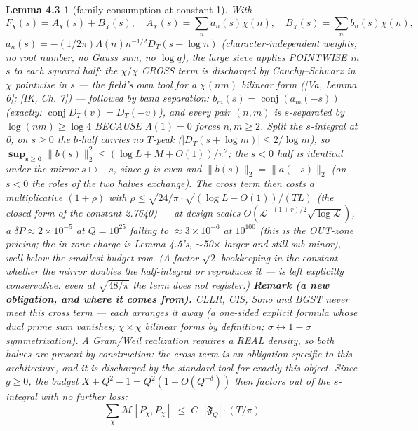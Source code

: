 \documentclass[11pt]{amsart}
\newcommand{\conj}{\operatorname{conj}}
\theoremstyle{plain}
\newtheorem*{lemmafourthree}{Lemma 4.3}
\theoremstyle{remark}
\begin{document}
\begin{lemmafourthree}[family consumption at constant 1]
With
\[
F_\chi(s) = A_\chi(s) + B_\chi(s), \quad A_\chi(s) = \sum_n a_n(s)\chi(n), \quad
B_\chi(s) = \sum_n b_n(s)\bar{\chi}(n),
\]
$a_n(s) = -(1/2\pi)\Lambda(n)n^{-1/2}D_T(s - \log n)$ (character-independent weights;
no root number, no Gauss sum, no $\log q$), the large sieve applies POINTWISE in $s$
to each squared half; the $\chi/\bar{\chi}$ CROSS term is discharged by
Cauchy--Schwarz in $\chi$ pointwise in $s$ --- the field's own tool for a $\chi(nm)$
bilinear form ([Va, Lemma 6]; [IK, Ch. 7]) --- followed by band separation:
$b_m(s) = \conj(a_m(-s))$ (exactly: $\conj D_T(v) = D_T(-v)$), and every pair
$(n, m)$ is $s$-separated by $\log(nm) \ge \log 4$ BECAUSE $\Lambda(1) = 0$ forces
$n, m \ge 2$. Split the $s$-integral at 0; on $s \ge 0$ the $b$-half carries no
$T$-peak ($|D_T(s + \log m)| \le 2/\log m$), so
$\boldsymbol{\sup_{s\ge0}} \lVert b(s)\rVert_2^2 \le (\log L + M + O(1))/\pi^2$; the
$s < 0$ half is identical under the mirror $s \mapsto -s$, since $g$ is even and
$\lVert b(s)\rVert_2 = \lVert a(-s)\rVert_2$ (on $s < 0$ the roles of the two halves
exchange). The cross term then costs a multiplicative $(1 + \rho)$ with
{\boldmath$\rho \le \sqrt{24/\pi}\cdot\sqrt{(\log L + O(1))/(TL)}$} (the closed form
of the constant 2.7640) --- at design scales
$O(\mathcal{L}^{-(1+r)/2}\sqrt{\log \mathcal{L}})$, a $\delta P \approx 2\times10^{-5}$
at $Q = 10^{25}$ falling to $\approx 3\times10^{-6}$ at $10^{100}$ (this is the
OUT-zone pricing; the in-zone charge is Lemma 4.5's, $\sim$50$\times$ larger and still
sub-minor), well below the smallest budget row. (A factor-$\sqrt{2}$ bookkeeping in
the constant --- whether the mirror doubles the half-integral or reproduces it --- is
left explicitly conservative: even at $\sqrt{48/\pi}$ the term does not register.)
\textbf{Remark (a new obligation, and where it comes from).} CLLR, CIS, Sono and BGST
never meet this cross term --- each arranges it away (a one-sided explicit formula
whose dual prime sum vanishes; $\chi\times\bar{\chi}$ bilinear forms by definition;
$\sigma \leftrightarrow 1-\sigma$ symmetrization). A Gram/Weil realization requires a
REAL density, so both halves are present by construction: the cross term is an
obligation specific to this architecture, and it is discharged by the standard tool
for exactly this object. Since $g \ge 0$, the budget
$X + Q^2 - 1 = Q^2(1 + O(Q^{-\delta}))$ then factors out of the $s$-integral with no
further loss:
\[
\sum_\chi \mathcal{M}[P_\chi, P_\chi] \;\le\; C\cdot|\mathfrak{F}_Q|\cdot(T/\pi)
\]
\end{lemmafourthree}
\end{document}
